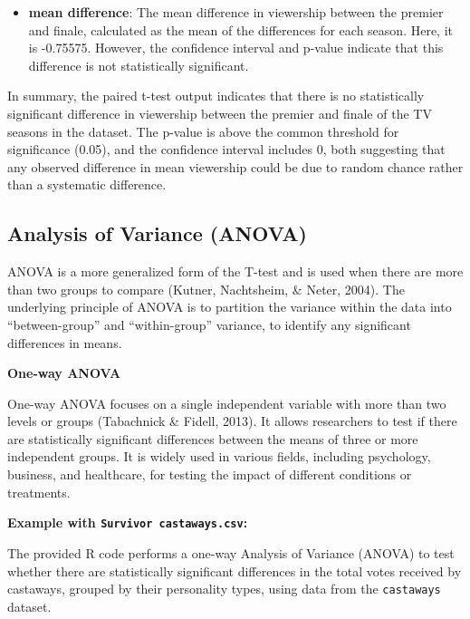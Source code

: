 \documentclass[
]{book}
\providecommand{\tightlist}{%
  \setlength{\itemsep}{0pt}\setlength{\parskip}{0pt}}
\begin{document}
\begin{enumerate}
  \begin{itemize}
  \tightlist
  \item
    \textbf{mean difference}: The mean difference in viewership between the premier and finale, calculated as the mean of the differences for each season. Here, it is -0.75575. However, the confidence interval and p-value indicate that this difference is not statistically significant.
  \end{itemize}
\end{enumerate}

In summary, the paired t-test output indicates that there is no statistically significant difference in viewership between the premier and finale of the TV seasons in the dataset. The p-value is above the common threshold for significance (0.05), and the confidence interval includes 0, both suggesting that any observed difference in mean viewership could be due to random chance rather than a systematic difference.

\subsection*{Analysis of Variance (ANOVA)}\label{analysis-of-variance-anova}

ANOVA is a more generalized form of the T-test and is used when there are more than two groups to compare (Kutner, Nachtsheim, \& Neter, 2004). The underlying principle of ANOVA is to partition the variance within the data into ``between-group'' and ``within-group'' variance, to identify any significant differences in means.

\textbf{One-way ANOVA}

One-way ANOVA focuses on a single independent variable with more than two levels or groups (Tabachnick \& Fidell, 2013). It allows researchers to test if there are statistically significant differences between the means of three or more independent groups. It is widely used in various fields, including psychology, business, and healthcare, for testing the impact of different conditions or treatments.

\textbf{Example with \texttt{Survivor\ castaways.csv}:}

The provided R code performs a one-way Analysis of Variance (ANOVA) to test whether there are statistically significant differences in the total votes received by castaways, grouped by their personality types, using data from the \texttt{castaways} dataset.
\end{document}
